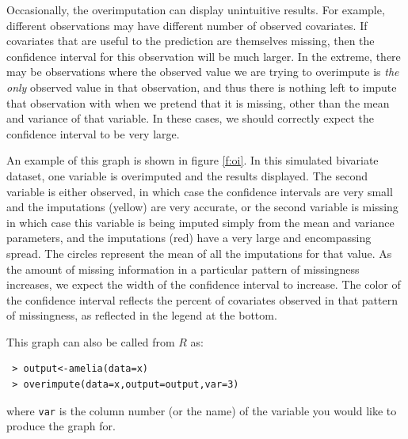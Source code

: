\documentclass[12pt,titlepage]{article}
\begin{document}
Occasionally, the overimputation can display unintuitive results.  For example, different observations may have different number of observed covariates.  If covariates that are useful to the prediction are themselves missing, then the confidence interval for this observation will be much larger.  In the extreme, there may be observations where the observed value we are trying to overimpute is \emph{the only} observed value in that observation, and thus there is nothing left to impute that observation with when we pretend that it is missing, other than the mean and variance of that variable.  In these cases, we should correctly expect the confidence interval to be very large.

An example of this graph is shown in figure \ref{f:oi}.  In this simulated bivariate dataset, one variable is overimputed and the results displayed.  The second variable is either observed, in which case the confidence intervals are very small and the imputations (yellow) are very accurate, or the second variable is missing in which case this variable is being imputed simply from the mean and variance parameters, and the imputations (red) have a very large and encompassing spread.  The circles represent the mean of all the imputations for that value.  As the amount of missing information in a particular pattern of missingness increases, we expect the width of the confidence interval to increase.  The color of the confidence interval reflects the percent of covariates observed in that pattern of missingness, as reflected in the legend at the bottom. 

This graph can also be called from $R$ as:
\begin{verbatim}
 > output<-amelia(data=x) 
 > overimpute(data=x,output=output,var=3)
\end{verbatim}
where \texttt{var} is the column number (or the name) of the variable you would like to produce the graph for.  
\end{document}
